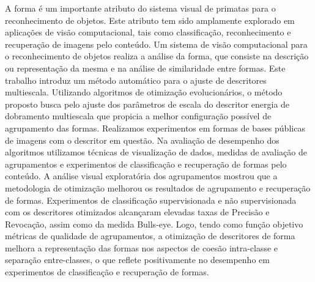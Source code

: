 A forma é um importante atributo do sistema visual de primatas para o reconhecimento de objetos. Este atributo tem sido amplamente explorado em  aplicações de visão computacional, tais como classificação, reconhecimento e recuperação de imagens pelo conteúdo. Um sistema de visão computacional para o reconhecimento de objetos realiza a análise da forma, que consiste na descrição ou representação da mesma e na análise de similaridade entre formas.  Este trabalho introduz um método automático para o ajuste de descritores multiescala. Utilizando algoritmos de otimização evolucionários, o método proposto busca pelo ajuste dos parâmetros de escala do descritor energia de dobramento multiescala que propicia a melhor configuração possível de agrupamento das formas. Realizamos experimentos em formas de bases públicas de imagens com o descritor em questão. Na avaliação de desempenho dos algoritmos utilizamos técnicas de visualização de dados, medidas de avaliação de agrupamentos e experimentos de classificação e recuperação de formas pelo conteúdo. A análise visual exploratória dos agrupamentos mostrou que a metodologia de otimização melhorou os resultados de agrupamento e recuperação de formas. Experimentos de classificação supervisionada e não supervisionada com os descritores otimizados alcançaram elevadas taxas de Precisão e Revocação, assim como da medida Bulls-eye. Logo, tendo como função objetivo métricas de qualidade de agrupamentos, a otimização de descritores de forma melhora a representação das formas nos aspectos de coesão intra-classe e separação entre-classes, o que reflete positivamente no desempenho em experimentos de classificação e recuperação de formas.
